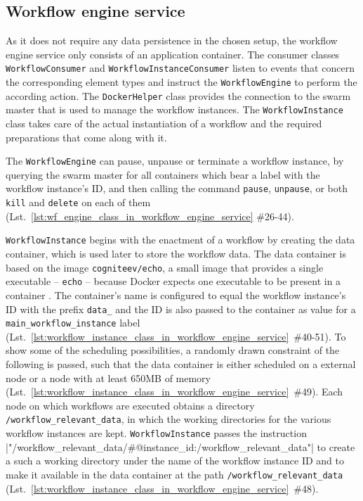   \subsection{Workflow engine service} %
    \label{sub:workflow_engine_service}
    As it does not require any data persistence in the chosen setup, the workflow engine service only consists of an application container. The consumer classes \texttt{WorkflowConsumer} and \texttt{WorkflowInstanceConsumer} listen to events that concern the corresponding element types and instruct the \texttt{WorkflowEngine} to perform the according action. The \texttt{DockerHelper} class provides the connection to the swarm master that is used to manage the workflow instances.
    The \texttt{WorkflowInstance} class takes care of the actual instantiation of a workflow and the required preparations that come along with it.

    The \texttt{WorkflowEngine} can pause, unpause or terminate a workflow instance, by querying the swarm master for all containers which bear a label with the workflow instance's \ac{ID}, and then calling the command \texttt{pause}, \texttt{unpause}, or both \texttt{kill} and \texttt{delete} on each of them (Lst.~\ref{lst:wf_engine_class_in_workflow_engine_service} \#26-44).

    \texttt{WorkflowInstance} begins with the enactment of a workflow by creating the data container, which is used later to store the workflow data. The data container is based on the image \texttt{cogniteev/echo}, a small image that provides a single executable -- \texttt{echo} -- because Docker expects one executable to be present in a container \cite{Cogniteev2015Docker}. The container's name is configured to equal the workflow instance's \ac{ID} with the prefix \texttt{data\_} and the \ac{ID} is also passed to the container as value for a \texttt{main\_workflow\_instance} label (Lst.~\ref{lst:workflow_instance_class_in_workflow_engine_service}~\#40-51).
    To show some of the scheduling possibilities, a randomly drawn constraint of the following
    is passed, such that the data container is either scheduled on a external node or a node with at least 650MB of memory (Lst.~\ref{lst:workflow_instance_class_in_workflow_engine_service}~\#49). Each node on which workflows are executed obtains a directory \texttt{/workflow\_relevant\_data}, in which the working directories for the various workflow instances are kept. \texttt{WorkflowInstance} passes the instruction
    |"/workflow_relevant_data/#{@instance_id}:/workflow_relevant_data"|
    to create a such a working directory under the name of the workflow instance \ac{ID} and to make it available in the data container at the path \texttt{/workflow\_relevant\_data} (Lst.~\ref{lst:workflow_instance_class_in_workflow_engine_service}~\#48).

